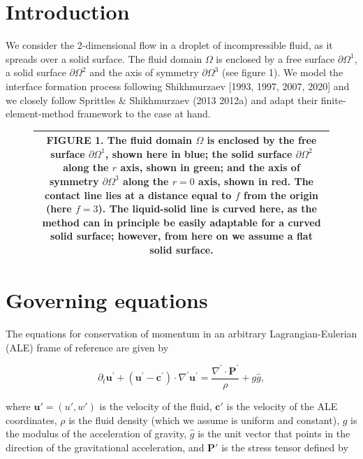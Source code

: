 \documentclass{article}
\begin{document}
\section{Introduction}

We consider the 2-dimensional flow in a droplet of incompressible fluid, as it spreads over a solid surface. The fluid domain \(\Omega\) is enclosed by a free surface \(\partial \Omega^{1}\), a solid surface \(\partial \Omega^{2}\) and the axis of symmetry \(\partial \Omega^{3}\) (see figure 1). We model the interface formation process following Shikhmurzaev [1993, 1997, 2007, 2020] and we closely follow Sprittles \& Shikhmurzaev (2013 2012a) and adapt their finite-element-method framework to the case at hand.

\begin{figure}[h]
\centering
\begin{tabular}{|c|}
\hline
FIGURE 1. The fluid domain \(\Omega\) is enclosed by the free surface \(\partial \Omega^1\), shown here in blue; the solid surface \(\partial \Omega^2\) along the \(r\) axis, shown in green; and the axis of symmetry \(\partial \Omega^3\) along the \(r = 0\) axis, shown in red. The contact line lies at a distance equal to \(f\) from the origin (here \(f = 3\)). The liquid-solid line is curved here, as the method can in principle be easily adaptable for a curved solid surface; however, from here on we assume a flat solid surface. \\
\hline
\end{tabular}
\end{figure}

\section{Governing equations}

The equations for conservation of momentum in an arbitrary Lagrangian-Eulerian (ALE) frame of reference are given by

\begin{equation}
\partial_{t}\pmb {u}^{\prime} + (\pmb {u}^{\prime} - \pmb {c}^{\prime})\cdot \nabla^{\prime}\pmb {u}^{\prime} = \frac{\nabla^{\prime}\cdot\pmb{P}^{\prime}}{\rho} +g\hat{g}, \tag{2.1}
\end{equation}

where \(\pmb {u}' = (u',w')\) is the velocity of the fluid, \(\pmb {c}'\) is the velocity of the ALE coordinates, \(\rho\) is the fluid density (which we assume is uniform and constant), \(g\) is the modulus of the acceleration of gravity, \(\hat{g}\) is the unit vector that points in the direction of the gravitational acceleration, and \(\pmb{P}'\) is the stress tensor defined by
\end{document}
